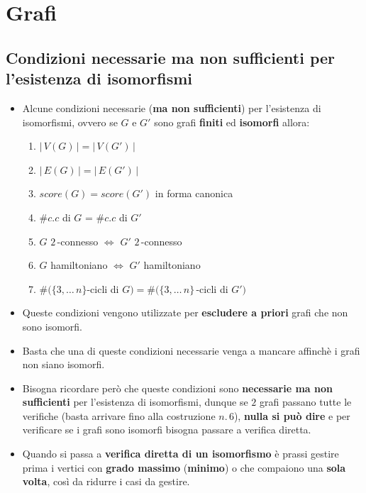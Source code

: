\documentclass[10pt]{article}
\begin{document}
	\newpage
	\section{Grafi}
	\subsection{Condizioni necessarie ma non sufficienti per l'esistenza di isomorfismi}
	\begin{itemize}
	\item
	Alcune condizioni necessarie (\textbf{ma non sufficienti}) per l'esistenza di isomorfismi, ovvero se $G$ e $G'$ sono grafi \textbf{finiti} ed \textbf{isomorfi} allora:
	\begin{enumerate}
	\item
	$|\,V(G)\,| = |\,V(G')\,|$
	\item
	$|\,E(G)\,| = |\,E(G')\,|$
	\item
	$score(G) = score(G')$ {\tiny{in forma canonica}}
	\item
	$\#c.c$ di $G$ = $\# c.c$ di $G'$
	\item
	$G$ $2\,$-connesso $\Longleftrightarrow$ $G'$ $2\,$-connesso
	\item
	$G$ hamiltoniano $\Longleftrightarrow$ $G'$ hamiltoniano
	\item
	$\# (\{3,\dotso\,n\}$-cicli di $G) = \# (\{3,\dotso\,n\}\,$-cicli di $G')$
	\end{enumerate}
	\item
	Queste condizioni vengono utilizzate per \textbf{escludere a priori} grafi che non sono isomorfi.
	\item
	Basta che una di queste condizioni necessarie venga a mancare affinchè i grafi non siano isomorfi.
	\item
	Bisogna ricordare però che queste condizioni sono \textbf{necessarie ma non sufficienti} per l'esistenza di isomorfismi, dunque se $2$ grafi passano tutte le verifiche (basta arrivare fino alla costruzione $n. \,6$), \textbf{nulla si può dire} e per verificare se i grafi sono isomorfi bisogna passare a verifica diretta.
	\item
	Quando si passa a \textbf{verifica diretta di un isomorfismo} è prassi gestire prima i vertici con \textbf{grado massimo} (\textbf{minimo}) o che compaiono una \textbf{sola volta}, così da ridurre i casi da gestire.
	\end{itemize}
	
\end{document}

